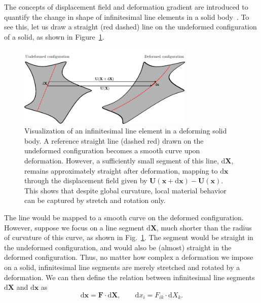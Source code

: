 \documentclass[a4paper,11pt]{article}
\begin{document}
The concepts of displacement field and deformation gradient are introduced to quantify the change in shape of infinitesimal line elements in a solid body~\cite{bonet1997nonlinear}. To see this, let us draw a straight (red dashed) line on the undeformed configuration of a solid, as shown in Figure~\ref{fig:dx}.
\begin{figure}[H]
\centering
\includegraphics[width=0.75\textwidth]{images/dx.pdf}
\caption{Visualization of an infinitesimal line element in a deforming solid body. A reference straight line (dashed red) drawn on the undeformed configuration becomes a smooth curve upon deformation. However, a sufficiently small segment of this line, $\text{d}\mathbf{X}$, remains approximately straight after deformation, mapping to $\text{d}\mathbf{x}$ through the displacement field given by $\mathbf{U}(\mathbf{x}+\text{d}\mathbf{x})-\mathbf{U}(\mathbf{x})$. This shows that despite global curvature, local material behavior can be captured by stretch and rotation only.}
\label{fig:dx}
\end{figure}
The line would be mapped to a smooth curve on the deformed configuration. However, suppose we focus on a line segment $\text{d}\mathbf{X}$, much shorter than the radius of curvature of this curve, as shown in Fig.~\ref{fig:dx}.  The segment would be straight in the undeformed configuration, and would also be (almost) straight in the deformed configuration.  Thus, no matter how complex a deformation we impose on a solid, infinitesimal line segments are merely stretched and rotated by a deformation. We can then define the relation between infinitesimal line segments $\text{d}\mathbf{X}$ and $\text{d}\mathbf{x}$ as
\begin{equation}
\text{d}\mathbf{x}=\mathbf{F}\cdot \text{d}\mathbf{X}, \qquad \text{d}x_i=F_{ik}\cdot \text{d}X_k.
\end{equation}
\end{document}
